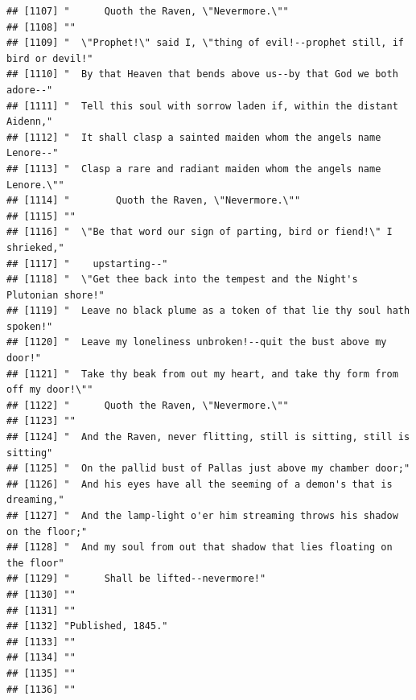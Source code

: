 \documentclass{article}\usepackage[]{graphicx}\usepackage[]{color}
\makeatletter
\newenvironment{kframe}{%
 \def\at@end@of@kframe{}%
 \ifinner\ifhmode%
  \def\at@end@of@kframe{\end{minipage}}%
  \begin{minipage}{\columnwidth}%
 \fi\fi%
 \def\FrameCommand##1{\hskip\@totalleftmargin \hskip-\fboxsep
 \colorbox{shadecolor}{##1}\hskip-\fboxsep
     \hskip-\linewidth \hskip-\@totalleftmargin \hskip\columnwidth}%
 \MakeFramed {\advance\hsize-\width
   \@totalleftmargin\z@ \linewidth\hsize
   \@setminipage}}%
 {\par\unskip\endMakeFramed%
 \at@end@of@kframe}
\newenvironment{knitrout}{}{} %
\makeatother
\begin{document}
\begin{knitrout}
\begin{kframe}
\begin{verbatim}
## [1107] "      Quoth the Raven, \"Nevermore.\""                                       
## [1108] ""                                                                            
## [1109] "  \"Prophet!\" said I, \"thing of evil!--prophet still, if bird or devil!"   
## [1110] "  By that Heaven that bends above us--by that God we both adore--"           
## [1111] "  Tell this soul with sorrow laden if, within the distant Aidenn,"           
## [1112] "  It shall clasp a sainted maiden whom the angels name Lenore--"             
## [1113] "  Clasp a rare and radiant maiden whom the angels name Lenore.\""            
## [1114] "        Quoth the Raven, \"Nevermore.\""                                     
## [1115] ""                                                                            
## [1116] "  \"Be that word our sign of parting, bird or fiend!\" I shrieked,"          
## [1117] "    upstarting--"                                                            
## [1118] "  \"Get thee back into the tempest and the Night's Plutonian shore!"         
## [1119] "  Leave no black plume as a token of that lie thy soul hath spoken!"         
## [1120] "  Leave my loneliness unbroken!--quit the bust above my door!"               
## [1121] "  Take thy beak from out my heart, and take thy form from off my door!\""    
## [1122] "      Quoth the Raven, \"Nevermore.\""                                       
## [1123] ""                                                                            
## [1124] "  And the Raven, never flitting, still is sitting, still is sitting"         
## [1125] "  On the pallid bust of Pallas just above my chamber door;"                  
## [1126] "  And his eyes have all the seeming of a demon's that is dreaming,"          
## [1127] "  And the lamp-light o'er him streaming throws his shadow on the floor;"     
## [1128] "  And my soul from out that shadow that lies floating on the floor"          
## [1129] "      Shall be lifted--nevermore!"                                           
## [1130] ""                                                                            
## [1131] ""                                                                            
## [1132] "Published, 1845."                                                            
## [1133] ""                                                                            
## [1134] ""                                                                            
## [1135] ""                                                                            
## [1136] ""                                                                            

\end{verbatim}
\end{kframe}
\end{knitrout}
\end{document}
